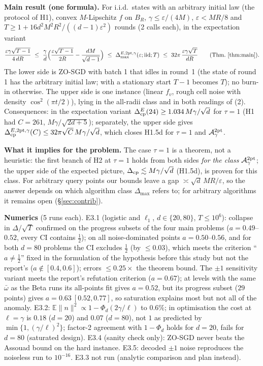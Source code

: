 \documentclass[11pt,a4paper]{article}
\numberwithin{equation}{section}
\theoremstyle{definition}
\theoremstyle{remark}
\newcommand{\E}{\mathbb E}\newcommand{\R}{\mathbb R}\newcommand{\Z}{\mathbb Z}\newcommand{\Prob}{\mathbb P}
\newcommand{\Dmax}{\Delta_{\max}}\newcommand{\Dcp}{\Delta_{\rm cp}}\newcommand{\Dlow}{\Delta_{\rm low}}
\newcommand{\wbar}{\bar\omega}\newcommand{\Atwo}{\cA^{\rm 2pt}_\gamma}
\begin{document}
\begin{tcolorbox}[card,title={H3 in one page}]
\textbf{Main result (one formula).} For i.i.d.\ states with an arbitrary initial law (the protocol of H1), convex $M$-Lipschitz $f$ on $B_R$, $\gamma\le\varepsilon/(4M)$, $\varepsilon<MR/8$ and $T\ge 1+16d^2M^2R^2/((d-1)\varepsilon^2)$ rounds (2 calls each), in the expectation variant
\[
\frac{\varepsilon\gamma\sqrt{T-1}}{4\,dR}\ \le\ \frac{\gamma}{d}\Big(\frac{\varepsilon\sqrt{T-1}}{2R}-\frac{dM}{\sqrt{d-1}}\Big)\ \le\ \Dmax^{E,\mathrm{2pt},\gamma}(\varepsilon;\iid;T)\ \le\ 32\pi\,\frac{\varepsilon\gamma\sqrt T}{dR}
\qquad(\text{Thm.~\ref{thm:main}}).
\]
The lower side is ZO-SGD with batch 1 that idles in round~1 (the state of round 1 has the arbitrary initial law; with a stationary start $T-1$ becomes $T$); no burn-in otherwise. The upper side is one instance (linear $f_v$, rough cell noise with density $\cos^2(\pi t/2)$), lying in the all-radii class and in both readings of (2). Consequences: in the expectation variant $\Dcp^{E}(24)\ge1.034\,M\gamma/\sqrt d$ for $\tau=1$ (H1 had $C=261$, $M\gamma/\sqrt{2d+5}$); separately, the upper side gives $\Dcp^{E,\mathrm{2pt},\gamma}(C)\le32\pi\sqrt C\,M\gamma/\sqrt d$, which closes H1.5d for $\tau=1$ and $\Atwo$.

\textbf{What it implies for the problem.} The case $\tau=1$ is a theorem, not a heuristic: the first branch of H2 at $\tau=1$ holds from both sides \emph{for the class $\Atwo$}; the upper side of the expected picture, $\Dcp\lesssim M\gamma/\sqrt d$ (H1.5d), is proven for this class. For arbitrary query points our bounds leave a gap $\asymp\sqrt d\,MR/\varepsilon$, so the answer depends on which algorithm class $\Dmax$ refers to; for arbitrary algorithms it remains open (\S\ref{sec:contrib}).

\textbf{Numerics} (5 runs each). E3.1 (logistic and $\ell_1$, $d\in\{20,80\}$, $T\le10^6$): collapse in $\Delta/\sqrt T$ confirmed on the progress subsets of the four main problems ($a=0.49$--$0.52$, every CI contains $\frac12$); on all noise-dominated points $a=0.50$--$0.56$, and for both $d=80$ problems the CI excludes $\frac12$ (by $\le0.03$), which meets the criterion ``$a\ne\frac12$'' fixed in the formulation of the hypothesis before this study but not the report's ($a\notin[0.4,0.6]$); errors $\le0.25\times$ the theorem bound. The $\pm1$ sensitivity variant meets the report's refutation criterion ($a=0.67$); at levels with the same $\wbar$ as the Beta runs its all-points fit gives $a=0.52$, but its progress subset ($29$ points) gives $a=0.63\ [0.52,0.77]$, so saturation explains most but not all of the anomaly. E3.2: $\E\|n\|^2\propto1-\Phi_d(2\gamma/\ell)$ to $0.6\%$; in optimisation the cost at $\ell=\gamma$ is $0.18$ ($d=20$) and $0.07$ ($d=80$), not $1$ as predicted by $\min\{1,(\gamma/\ell)^2\}$; factor-2 agreement with $1-\Phi_d$ holds for $d=20$, fails for $d=80$ (saturated design). E3.4 (sanity check only): ZO-SGD never beats the Assouad bound on the hard instance. E3.5: decoded $\pm1$ noise reproduces the noiseless run to $10^{-16}$. E3.3 not run (analytic comparison and plan instead).

\end{tcolorbox}
\end{document}
